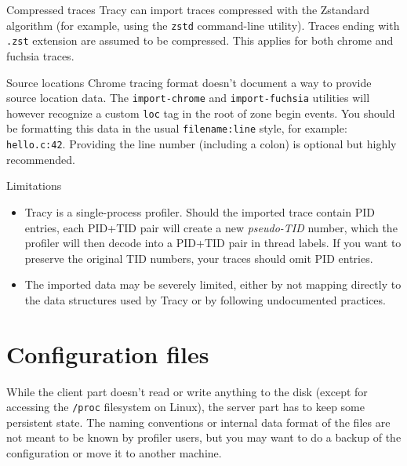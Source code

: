 \documentclass[hidelinks,titlepage,a4paper,twoside]{article}
\begin{document}
\begin{bclogo}[
noborder=true,
couleur=black!5,
logo=\bclampe
]{Compressed traces}
Tracy can import traces compressed with the Zstandard algorithm (for example, using the \texttt{zstd} command-line utility). Traces ending with \texttt{.zst} extension are assumed to be compressed.
This applies for both chrome and fuchsia traces.
\end{bclogo}

\begin{bclogo}[
noborder=true,
couleur=black!5,
logo=\bclampe
]{Source locations}
Chrome tracing format doesn't document a way to provide source location data.
  The \texttt{import-chrome} and \texttt{import-fuchsia} utilities will however recognize a custom \texttt{loc} tag in the root of zone begin events. You should be formatting this data in the usual \texttt{filename:line} style, for example: \texttt{hello.c:42}. Providing the line number (including a colon) is optional but highly recommended.
\end{bclogo}

\begin{bclogo}[
noborder=true,
couleur=black!5,
logo=\bcattention
]{Limitations}
\begin{itemize}
\item Tracy is a single-process profiler. Should the imported trace contain PID entries, each PID+TID pair will create a new \emph{pseudo-TID} number, which the profiler will then decode into a PID+TID pair in thread labels. If you want to preserve the original TID numbers, your traces should omit PID entries.
\item The imported data may be severely limited, either by not mapping directly to the data structures used by Tracy or by following undocumented practices.
\end{itemize}
\end{bclogo}

\section{Configuration files}
\label{configurationfiles}

While the client part doesn't read or write anything to the disk (except for accessing the \texttt{/proc} filesystem on Linux), the server part has to keep some persistent state. The naming conventions or internal data format of the files are not meant to be known by profiler users, but you may want to do a backup of the configuration or move it to another machine.
\end{document}
